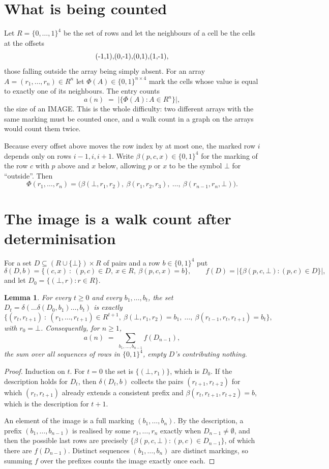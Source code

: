 \documentclass[11pt,a4paper]{article}
\theoremstyle{plain}
\newtheorem{lemma}[theorem]{Lemma}
\theoremstyle{definition}
\begin{document}
\section{What is being counted}

Let $R=\{0,\dots,1\}^{4}$ be the set of rows and let the neighbours of a cell be the
cells at the offsets
\[
$(-1,1)$, $(0,-1)$, $(0,1)$, $(1,-1)$,
\]
those falling outside the array being simply absent. For an array
$A=(r_1,\dots,r_n)\in R^n$ let $\Phi(A)\in\{0,1\}^{n\times4}$ mark the cells whose value
is equal to exactly one of its neighbours. The entry counts
\[
a(n)\;=\;\bigl|\{\Phi(A):A\in R^n\}\bigr| ,
\]
the size of an IMAGE. This is the whole difficulty: two different arrays with the same marking
must be counted once, and a walk count in a graph on the arrays would count them twice.

Because every offset above moves the row index by at most one, the marked row $i$ depends only
on rows $i-1,i,i+1$. Write $\beta(p,c,x)\in\{0,1\}^{4}$ for the marking of the row $c$
with $p$ above and $x$ below, allowing $p$ or $x$ to be the symbol $\bot$ for ``outside''.
Then
\[
\Phi(r_1,\dots,r_n)=\bigl(\beta(\bot,r_1,r_2),\ \beta(r_1,r_2,r_3),\ \dots,\
\beta(r_{n-1},r_n,\bot)\bigr).
\]

\section{The image is a walk count after determinisation}

For a set $D\subseteq(R\cup\{\bot\})\times R$ of pairs and a row $b\in\{0,1\}^{4}$ put
\[
\delta(D,b)=\{(c,x)\ :\ (p,c)\in D,\ x\in R,\ \beta(p,c,x)=b\},\qquad
f(D)=\bigl|\{\beta(p,c,\bot):(p,c)\in D\}\bigr| ,
\]
and let $D_0=\{(\bot,r):r\in R\}$.

\begin{lemma}\label{lem:det}
For every $t\ge0$ and every $b_1,\dots,b_t$, the set
$D_t=\delta(\dots\delta(D_0,b_1)\dots,b_t)$ is exactly
\[
\{(r_t,r_{t+1})\ :\ (r_1,\dots,r_{t+1})\in R^{t+1},\ \beta(\bot,r_1,r_2)=b_1,\ \dots,\
\beta(r_{t-1},r_t,r_{t+1})=b_t\} ,
\]
with $r_0=\bot$. Consequently, for $n\ge1$,
\[
a(n)\;=\;\sum_{b_1,\dots,b_{n-1}}f(D_{n-1}),
\]
the sum over all sequences of rows in $\{0,1\}^{4}$, empty $D$'s contributing nothing.
\end{lemma}

\begin{proof}
Induction on $t$. For $t=0$ the set is $\{(\bot,r_1)\}$, which is $D_0$. If the description
holds for $D_t$, then $\delta(D_t,b)$ collects the pairs $(r_{t+1},r_{t+2})$ for which
$(r_t,r_{t+1})$ already extends a consistent prefix and
$\beta(r_t,r_{t+1},r_{t+2})=b$, which is the description for $t+1$.

An element of the image is a full marking $(b_1,\dots,b_n)$. By the description, a prefix
$(b_1,\dots,b_{n-1})$ is realised by some $r_1,\dots,r_n$ exactly when $D_{n-1}\neq
\emptyset$, and then the possible last rows are precisely
$\{\beta(p,c,\bot):(p,c)\in D_{n-1}\}$, of which there are $f(D_{n-1})$. Distinct
sequences $(b_1,\dots,b_n)$ are distinct markings, so summing $f$ over the prefixes counts the
image exactly once each.
\end{proof}
\end{document}
